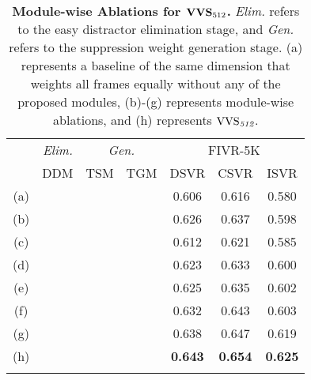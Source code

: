 \documentclass[10pt,twocolumn,letterpaper]{article}
\newcommand{\cmark}{\ding{51}}
\begin{document}
    \begin{table}[!t] \footnotesize
        \centering
        \begin{tabular}{c|ccc|ccc}
            \cmidrule[\heavyrulewidth]{1-7}
            \morecmidrules
            \cmidrule[\heavyrulewidth]{1-7}
\multicolumn{1}{c}{\multirow{2}{*}[-.3em]{$\textbf{\textup{VVS}}_{\textit{512}}$}}
            & \multicolumn{1}{|c|}{\textit{Elim.}}  & \multicolumn{2}{c|}{\textit{Gen.}} & \multicolumn{3}{c}{FIVR-5K} \\ \cmidrule(){2-7} 
           
                &\multicolumn{1}{c|}{DDM} & TSM    & TGM    & DSVR  & CSVR  & ISVR  \\ \midrule 
            (a) &       &        &        & 0.606 &	0.616 &	0.580 \\ \midrule
            (b) &\cmark &        &        & 0.626 &	0.637 &	0.598 \\ \midrule
            (c) &       & \cmark &        & 0.612 &	0.621 &	0.585 \\
            (d) &       &        & \cmark & 0.623 &	0.633 &	0.600 \\
            (e) &       & \cmark & \cmark & 0.625 &	0.635 &	0.602 \\ \midrule 
            (f) &\cmark & \cmark &        & 0.632 &	0.643 &	0.603 \\ 
            (g) &\cmark &        & \cmark & 0.638 &	0.647 &	0.619 \\ \midrule
            (h) &\cmark & \cmark & \cmark & \textbf{0.643} & \textbf{0.654} & \textbf{0.625} \\
            \cmidrule[\heavyrulewidth]{1-7}
            \morecmidrules
            \cmidrule[\heavyrulewidth]{1-7}
        \end{tabular}
        \vspace{3mm}
        \caption{\textbf{Module-wise Ablations for $\textbf{\textup{VVS}}_{512}$\textbf{.} }\textit{Elim.} refers to the easy distractor elimination stage, and \textit{Gen.} refers to the suppression weight generation stage. (a) represents a baseline of the same dimension that weights all frames equally without any of the proposed modules, (b)-(g) represents module-wise ablations, and (h) represents $\textup{VVS}_{\textit{512}}$. \vspace{-0mm}}
        \label{tab:module_ablation512}
    \end{table}
\end{document}

